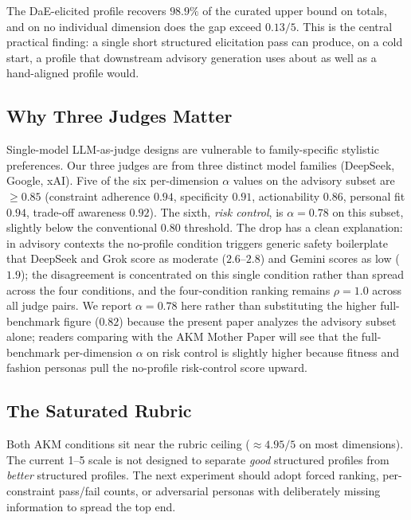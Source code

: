 \documentclass[11pt]{article}
\begin{document}
The DaE-elicited profile recovers $98.9\%$ of the curated upper bound on totals, and on no individual dimension does the gap exceed $0.13/5$. This is the central practical finding: a single short structured elicitation pass can produce, on a cold start, a profile that downstream advisory generation uses about as well as a hand-aligned profile would.

\subsection{Why Three Judges Matter}

Single-model LLM-as-judge designs are vulnerable to family-specific stylistic preferences. Our three judges are from three distinct model families (DeepSeek, Google, xAI). Five of the six per-dimension $\alpha$ values on the advisory subset are $\geq 0.85$ (constraint adherence $0.94$, specificity $0.91$, actionability $0.86$, personal fit $0.94$, trade-off awareness $0.92$). The sixth, \emph{risk control}, is $\alpha = 0.78$ on this subset, slightly below the conventional $0.80$ threshold. The drop has a clean explanation: in advisory contexts the no-profile condition triggers generic safety boilerplate that DeepSeek and Grok score as moderate ($2.6$--$2.8$) and Gemini scores as low ($1.9$); the disagreement is concentrated on this single condition rather than spread across the four conditions, and the four-condition ranking remains $\rho = 1.0$ across all judge pairs. We report $\alpha = 0.78$ here rather than substituting the higher full-benchmark figure ($0.82$) because the present paper analyzes the advisory subset alone; readers comparing with the AKM Mother Paper \citep{shao2026akm} will see that the full-benchmark per-dimension $\alpha$ on risk control is slightly higher because fitness and fashion personas pull the no-profile risk-control score upward.

\subsection{The Saturated Rubric}

Both AKM conditions sit near the rubric ceiling ($\approx 4.95/5$ on most dimensions). The current 1--5 scale is not designed to separate \emph{good} structured profiles from \emph{better} structured profiles. The next experiment should adopt forced ranking, per-constraint pass/fail counts, or adversarial personas with deliberately missing information to spread the top end.
\end{document}
